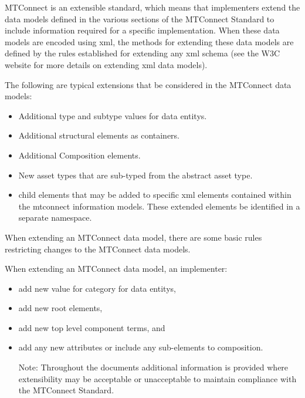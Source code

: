 MTConnect is an extensible standard, which means that implementers \MAY extend the \glspl{data model} defined in the various sections of the MTConnect Standard to include information required for a specific implementation.  When these \glspl{data model} are encoded using \gls{xml}, the methods for extending these \glspl{data model} are defined by the rules established for extending any \gls{xml} schema (see the W3C website for more details on extending \gls{xml} data models).

The following are typical extensions that \MAY be considered in the MTConnect \glspl{data model}:

\begin{itemize}

\item Additional \gls{type} and \gls{subtype} values for \glspl{data entity}.

\item Additional \glspl{structural element} as containers.

\item Additional Composition elements.

\item New \gls{asset} types that are sub-typed from the abstract \gls{asset} type.

\item \glspl{child element} that may be added to specific \gls{xml} elements contained within the \glspl{mtconnect information model}.  These extended elements \MUST be identified in a separate \gls{namespace}.

\end{itemize}

When extending an MTConnect \gls{data model}, there are some basic rules restricting changes to the MTConnect \glspl{data model}.

When extending an MTConnect \gls{data model}, an implementer:

\begin{itemize}

\item \MUSTNOT add new value for category for \glspl{data entity},

\item \MUSTNOT add new \glspl{root element},

\item \SHOULDNOT add new \gls{top level} \glspl{component term}, and

\item \MUSTNOT add any new attributes or include any sub-elements to \gls{composition}.

\begin{note}
Note:  Throughout the documents additional information is provided where extensibility may be acceptable or unacceptable to maintain compliance with the MTConnect Standard.

\end{note}

\end{itemize}


